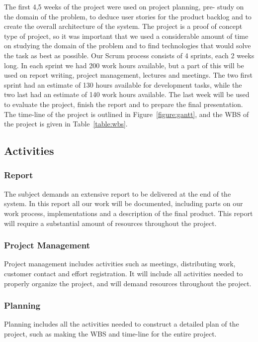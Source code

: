 The first 4,5 weeks of the project were used on project planning, pre- study on the domain of the problem, to deduce user stories for the product backlog and to create the overall architecture of the system. The project is a proof of concept type of project, so it was important that we used a considerable amount of time on studying the domain of the problem and to find technologies that would solve the task as best as possible. Our Scrum process consists of 4 sprints, each 2 weeks long. In each sprint we had 200 work hours available, but a part of this will be used on report writing, project management, lectures and meetings. The two first sprint had an estimate of 130 hours available for development tasks, while the two last had an estimate of 140 work hours available. The last week will be used to evaluate the project, finish the report and to prepare the final presentation. The time-line of the project is outlined in Figure~\ref{figure:gantt}, and the WBS of the project is given in Table~\ref{table:wbs}.

\subsection{Activities}
\subsubsection{Report}
The subject demands an extensive report to be delivered at the end of the system. In this report all our work will be documented, including parts on our work process, implementations and a description of the final product. This report will require a substantial amount of resources throughout the project.

\subsubsection{Project Management}
Project management includes activities such as meetings, distributing work, customer contact and effort registration. It will include all activities needed to properly organize the project, and will demand resources throughout the project. 

\subsubsection{Planning}
Planning includes all the activities needed to construct a detailed plan of the project, such as making the WBS and time-line for the entire project. 

